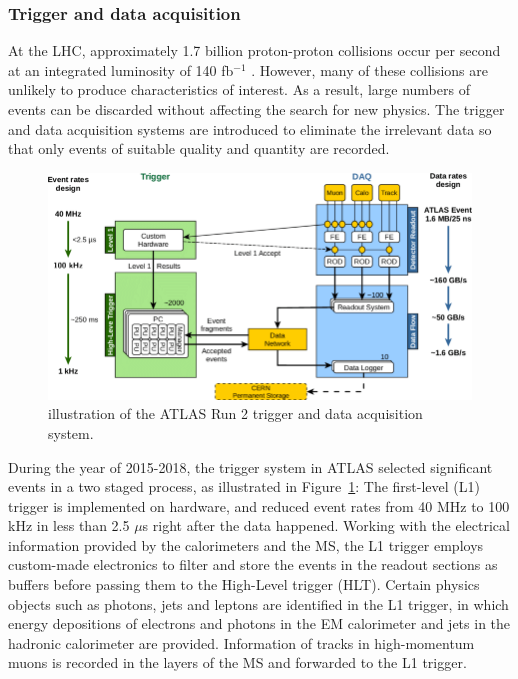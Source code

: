 \documentclass[UTF8,12pt]{ctexart}
\numberwithin{equation}{section}
\def\ifb{fb$^{-1}$ }
\begin{document}
\subsubsection{Trigger and data acquisition}
\label{sec:3.2.4}

At the LHC, approximately 1.7 billion proton-proton collisions occur per second at an integrated luminosity of 140 \ifb. However, many of these collisions are unlikely to produce characteristics of interest. As a result, large numbers of events can be discarded without affecting the search for new physics. The trigger and data acquisition systems are introduced to eliminate the irrelevant data so that only events of suitable quality and quantity are recorded.

\begin{figure}[htb] 
	\centering  
	\includegraphics[width=16cm]{./fig/dq.png}	\caption{illustration of the ATLAS  Run 2 trigger and data acquisition system.}
	\label{Fig.dq}
\end{figure}

During the year of 2015-2018, the trigger system in ATLAS selected significant events in a two staged process, as illustrated in Figure~\ref{Fig.dq}: The first-level (L1) trigger is implemented on hardware, and reduced event rates from 40 MHz to 100 kHz in less than 2.5 $\mu$s right after the data happened. Working with the electrical information provided by the calorimeters and the MS, the L1 trigger employs custom-made electronics to filter and store the events in the readout sections as buffers before passing them to the High-Level trigger (HLT). Certain physics objects such as photons, jets and leptons are identified in the L1 trigger, in which energy depositions of electrons and photons in the EM calorimeter and jets in the hadronic calorimeter are provided. Information of tracks in high-momentum muons is recorded in the layers of the MS and forwarded to the L1 trigger.
\end{document}
